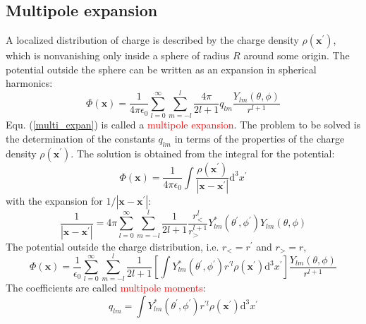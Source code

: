 \documentclass[12pt,a4paper]{article}
\renewcommand{\vec}[1]{\boldsymbol{#1}}
\newcommand{\dif}{\mathrm{d}}
\begin{document}
\subsection{Multipole expansion}
A localized distribution of charge is described by the charge density $\rho(\vec{x}^\prime)$, which is nonvanishing only inside a sphere of radius $R$ around some origin. The potential outside the sphere can be written as an expansion in spherical harmonics:
\begin{equation}
\Phi(\vec{x}) = \frac{1}{4\pi \epsilon_0} \sum_{l=0}^\infty \sum_{m=-l}^l \frac{4\pi}{2l+1} q_{lm} \frac{Y_{lm}(\theta, \phi)}{r^{l+1}}
\label{multi_expan}
\end{equation}
Equ. (\ref{multi_expan}) is called a \textcolor{red}{multipole expansion}. The problem to be solved is the determination of the constants $q_{lm}$ in terms of the properties of the charge density $\rho(\vec{x}^\prime)$. The solution is obtained from the integral for the potential:
\begin{equation*}
\Phi(\vec{x}) = \frac{1}{4\pi \epsilon_0} \int \frac{\rho(\vec{x}^\prime)}{|\vec{x} -\vec{x}^\prime|} \dif^3 x^\prime
\end{equation*}
with the expansion for $1/|\vec{x} -\vec{x}^\prime|$:
\begin{equation*}
\frac{1}{|\vec{x} -\vec{x}^\prime|} = 4\pi \sum_{l=0}^\infty \sum_{m=-l}^l \frac{1}{2l+1} \frac{r^l_<}{r^{l+1}_>} Y^\ast_{lm} (\theta^\prime, \phi^\prime) Y_{lm} (\theta, \phi) 
\end{equation*}
The potential outside the charge distribution, i.e. $r_< = r^\prime$ and $r_> = r$, 
\begin{equation}
\Phi(\vec{x}) = \frac{1}{\epsilon_0} \sum_{l=0}^\infty \sum_{m=-l}^l \frac{1}{2l+1} \left[\int Y^\ast_{lm} (\theta^\prime, \phi^\prime) r^{\prime l} \rho(\vec{x}^\prime) \dif^3 x^\prime \right] \frac{Y_{lm}(\theta, \phi)}{r^{l+1}}
\end{equation}
The coefficients are called \textcolor{red}{multipole moments}:
\begin{equation}
q_{lm} = \int Y^\ast_{lm} (\theta^\prime, \phi^\prime) r^{\prime l} \rho(\vec{x}^\prime) \dif^3 x^\prime
\end{equation}
\end{document}
